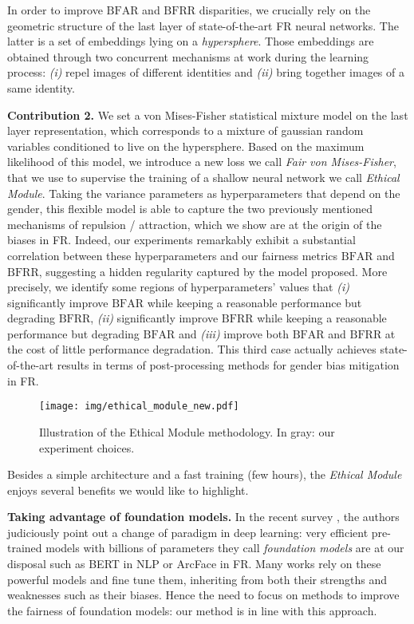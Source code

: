 \documentclass[nohyperref]{article}
\theoremstyle{plain}
\theoremstyle{definition}
\theoremstyle{remark}
\begin{document}
In order to improve $\mathrm{BFAR}$ and $\mathrm{BFRR}$ disparities, we crucially rely on the geometric structure of the last layer of state-of-the-art FR neural networks. The latter is a set of embeddings lying on a \textit{hypersphere}. Those embeddings are obtained through two concurrent mechanisms at work during the learning process: {\it (i)} repel images of different identities and {\it (ii)} bring together images of a same identity. 

{\bf Contribution 2.} We set a von Mises-Fisher statistical mixture model on the last layer representation, which corresponds to a mixture of gaussian random variables conditioned to live on the hypersphere. Based on the maximum likelihood of this model, we introduce a new loss we call {\it Fair von Mises-Fisher}, that we use to supervise the training of a shallow neural network we call {\it Ethical Module}. Taking the variance parameters as hyperparameters that depend on the gender, this flexible model is able to capture the two previously mentioned mechanisms of repulsion / attraction, which we show are at the origin of the biases in FR. Indeed, our experiments remarkably exhibit a substantial correlation between these hyperparameters and our fairness metrics $\mathrm{BFAR}$ and $\mathrm{BFRR}$, suggesting a hidden regularity captured by the model proposed. More precisely, we identify some regions of hyperparameters' values that {\it (i)} significantly improve $\mathrm{BFAR}$ while keeping a reasonable performance but degrading $\mathrm{BFRR}$, {\it (ii)} significantly improve $\mathrm{BFRR}$ while keeping a reasonable performance but degrading $\mathrm{BFAR}$ and {\it (iii)} improve both $\mathrm{BFAR}$ and $\mathrm{BFRR}$ at the cost of little performance degradation. This third case actually achieves state-of-the-art results in terms of post-processing methods for gender bias mitigation in FR.






\begin{figure}[h]
    \centering
    \texttt{[image: img/ethical\_module\_new.pdf]}
    \caption{Illustration of the Ethical Module methodology. In gray: our experiment choices.
}
    \label{fig:ethical_module}
\end{figure}

Besides a simple architecture and a fast training (few hours), the {\it Ethical Module} enjoys several benefits we would like to highlight. 

{\bf Taking advantage of foundation models.} In the recent survey \cite{bommasani2021opportunities}, the authors judiciously point out a change of paradigm in deep learning: very efficient pre-trained models with billions of parameters they call {\it foundation models} are at our disposal such as BERT \cite{devlin2018bert} in NLP or ArcFace \cite{arcface} in FR. Many works rely on these powerful models and fine tune them, inheriting from both their strengths and weaknesses such as their biases. Hence the need to focus on methods to improve the fairness of foundation models: our method is in line with this approach.
\end{document}
